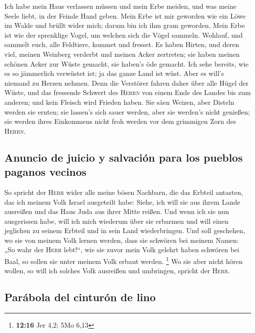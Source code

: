  Ich habe mein Haus verlassen müssen und mein Erbe meiden,
und was meine Seele liebt, in der Feinde Hand geben.  Mein
Erbe ist mir geworden wie ein Löwe im Walde und brüllt wider mich; darum
bin ich ihm gram geworden.  Mein Erbe ist wie der
sprenklige Vogel, um welchen sich die Vögel sammeln. Wohlauf, und
sammelt euch, alle Feldtiere, kommet und fresset.  Es
haben Hirten, und deren viel, meinen Weinberg verderbt und meinen Acker
zertreten; sie haben meinen schönen Acker zur Wüste gemacht, sie haben's
öde gemacht.  Ich sehe bereits, wie es so jämmerlich
verwüstet ist; ja das ganze Land ist wüst. Aber es will's niemand zu
Herzen nehmen.  Denn die Verstörer fahren daher über alle
Hügel der Wüste, und das fressende Schwert des \textsc{Herrn} von einem
Ende des Landes bis zum anderen; und kein Fleisch wird Frieden haben.
 Sie säen Weizen, aber Disteln werden sie ernten; sie
lassen's sich sauer werden, aber sie werden's nicht genießen; sie werden
ihres Einkommens nicht froh werden vor dem grimmigen Zorn des
\textsc{Herrn}.

\hypertarget{anuncio-de-juicio-y-salvaciuxf3n-para-los-pueblos-paganos-vecinos}{%
\subsection{Anuncio de juicio y salvación para los pueblos paganos
vecinos}\label{anuncio-de-juicio-y-salvaciuxf3n-para-los-pueblos-paganos-vecinos}}

 So spricht der \textsc{Herr} wider alle meine bösen
Nachbarn, die das Erbteil antasten, das ich meinem Volk Israel
ausgeteilt habe: Siehe, ich will sie aus ihrem Lande ausreißen und das
Haus Juda aus ihrer Mitte reißen.  Und wenn ich sie nun
ausgerissen habe, will ich mich wiederum über sie erbarmen und will
einen jeglichen zu seinem Erbteil und in sein Land wiederbringen.
 Und soll geschehen, wo sie von meinem Volk lernen
werden, dass sie schwören bei meinem Namen: „So wahr der \textsc{Herr}
lebt!{}``, wie sie zuvor mein Volk gelehrt haben schwören bei Baal, so
sollen sie unter meinem Volk erbaut werden. \footnote{\textbf{12:16} Jer
  4,2; 5Mo 6,13}  Wo sie aber nicht hören wollen, so will
ich solches Volk ausreißen und umbringen, spricht der \textsc{Herr}.

\hypertarget{paruxe1bola-del-cinturuxf3n-de-lino}{%
\subsection{Parábola del cinturón de
lino}\label{paruxe1bola-del-cinturuxf3n-de-lino}}

